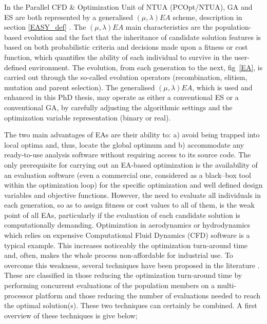 In the Parallel CFD \& Optimization Unit of NTUA (PCOpt/NTUA), GA and ES are both represented by a generalised $(\mu,\lambda)EA$ scheme, description in section \ref{EASY_def} \cite{phd_Giotis,phd_Karakasis,phd_Kampolis}.  The $(\mu,\lambda)EA$ main characteristics are the population-based evolution and the fact that the inheritance of candidate solution features is based on both probabilistic criteria and decisions made upon a fitness or cost function, which quantifies the ability of each individual to survive in the user-defined environment. The evolution, from each generation to the next, fig~\ref{EA}, is carried out through the so-called evolution operators (recombination, elitism, mutation and parent selection). The generalised $(\mu,\lambda)EA$, which is used and enhanced in this PhD thesis, may operate as either a conventional ES or a conventional GA, by carefully adjusting the algorithmic settings and the optimization variable representation (binary or real).  

The two main advantages of EAs are their ability to: a) avoid being trapped into local optima and, thus, locate the global optimum and b) accommodate any ready-to-use analysis software without requiring access to its source code. The only prerequisite for carrying out an EA-based optimization is the availability of an evaluation software (even a commercial one, considered as a black–box tool within the optimization loop) for the specific optimization  and well defined design variables and objective functions. However, the need to evaluate all individuals in each generation, so as to assign fitness or cost values to all of them, is the weak point of all EAs, particularly if the evaluation of each candidate solution is computationally demanding. Optimization in aerodynamics or hydrodynamics which relies on expensive Computational Fluid Dynamics (CFD) software is a typical example.  This increases noticeably the optimization turn-around time and, often, makes the whole process non-affordable for industrial use. To overcome this weakness, several techniques have been proposed in the literature \cite{LTT_2_020,Jin2002}. These  are classified in those reducing the optimization turn-around time by performing concurrent evaluations of the population members on a multi-processor platform and those reducing the number of evaluations needed to reach the optimal solution(s). These two techniques can certainly be combined. A first overview of these techniques is give below;  

